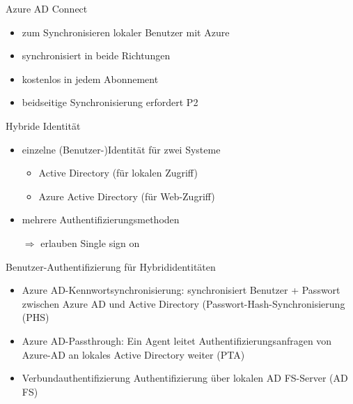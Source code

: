 

\begin{flashcard}[Definition]{Azure AD Connect}
    \begin{itemize}
        \item zum Synchronisieren lokaler Benutzer mit Azure
        \item synchronisiert in beide Richtungen
        \item kostenlos in jedem Abonnement
        \item beidseitige Synchronisierung erfordert P2
    \end{itemize}
\end{flashcard}

\begin{flashcard}[Definition]{Hybride Identität}
    \begin{itemize}
        \item einzelne (Benutzer-)Identität für zwei Systeme
            \begin{itemize}
                \item Active Directory (für lokalen Zugriff)
                \item Azure Active Directory (für Web-Zugriff)
            \end{itemize}
        \item mehrere Authentifizierungsmethoden
        \item[$\Rightarrow$] erlauben Single sign on
    \end{itemize}
\end{flashcard}

\begin{flashcard}[Definition]{Benutzer-Authentifizierung für Hybrididentitäten}
    \begin{itemize}
        \item Azure AD-Kennwortsynchronisierung:\newline
            synchronisiert Benutzer + Passwort zwischen Azure AD und Active Directory\newline
            (Passwort-Hash-Synchronisierung (PHS)
        \item Azure AD-Passthrough:\newline
            Ein Agent leitet Authentifizierungsanfragen von Azure-AD an lokales Active Directory weiter\newline
            (PTA)
        \item Verbundauthentifizierung\newline
            Authentifizierung über lokalen AD FS-Server\newline
            (AD FS)
    \end{itemize}
\end{flashcard}

